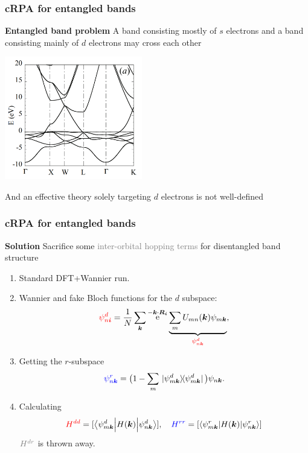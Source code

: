 \documentclass{beamer}
\DeclareMathOperator{\ee}{e}
\begin{document}
\begin{frame}
\frametitle{cRPA for entangled bands}

\textbf{Entangled band problem} 
A band consisting mostly of $s$ electrons 
and a band consisting mainly of $d$ electrons may cross each other 

\begin{center}
    \includegraphics[width=0.45\textwidth]{plots/ni-bands-1.PNG}
\end{center}

And an effective theory solely targeting $d$ electrons is not well-defined

\end{frame}

\begin{frame}
\frametitle{cRPA for entangled bands}

\textbf{Solution} Sacrifice some \textcolor{gray}{inter-orbital hopping terms} for disentangled band structure    

\begin{enumerate}
    \item Standard DFT+Wannier run.
    \item Wannier and fake Bloch functions for the $d$ subspace:
        \begin{equation}
            \textcolor{red}{\psi^d_{n \vb*{i}}} = \frac{1}{N} \sum_{\vb*{k}} 
                \ee^{- \vb*{k} \cdot \vb*{R}_{\vb*{i}}}
                \underbrace{\sum_m U_{mn}(\vb*{k}) \psi_{m \vb*{k}}}_{\textcolor{red}{\psi^{d}_{n \vb*{k}}}},
        \end{equation}
    \item Getting the $r$-subspace 
        \begin{equation}
            \textcolor{blue}{\psi^r_{n \vb*{k}}} = 
            \big(
                1 - \sum_m \dyad*{\psi^d_{m \vb*{k}}}
            \big) 
            \psi_{n \vb*{k}}.
        \end{equation}
    \item Calculating 
        \begin{equation}
            \textcolor{red}{H^{dd}} = [ \mel**{\psi^d_{m \vb*{k}}}{H(\vb*{k})}{\psi^d_{n \vb*{k}}} ], \quad 
            \textcolor{blue}{H^{rr}} = [ \mel**{\psi^r_{m \vb*{k}}}{H(\vb*{k})}{\psi^r_{n \vb*{k}}} ]
        \end{equation}
        $\textcolor{gray}{H^{dr}}$ is thrown away.
\end{enumerate}

\end{frame}
\end{document}

